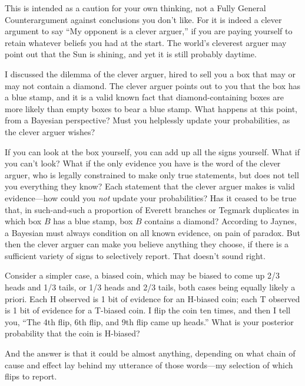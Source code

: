 {
 This is intended as a caution for your own thinking, not a Fully
General Counterargument against conclusions you don't
like. For it is indeed a clever argument to say ``My
opponent is a clever arguer,'' if you are paying
yourself to retain whatever beliefs you had at the start. The
world's cleverest arguer may point out that the Sun is
shining, and yet it is still probably daytime.}

\myendsectiontext


{
 I discussed the dilemma of the clever arguer, hired to sell you a
box that may or may not contain a diamond. The clever arguer points out
to you that the box has a blue stamp, and it is a valid known fact that
diamond-containing boxes are more likely than empty boxes to bear a
blue stamp. What happens at this point, from a Bayesian perspective?
Must you helplessly update your probabilities, as the clever arguer
wishes? }

{
 If you can look at the box yourself, you can add up all the signs
yourself. What if you can't look? What if the only
evidence you have is the word of the clever arguer, who is legally
constrained to make only true statements, but does not tell you
everything they know? Each statement that the clever arguer makes is
valid evidence---how could you \textit{not} update your probabilities?
Has it ceased to be true that, in such-and-such a proportion of Everett
branches or Tegmark duplicates in which box $B$ has a blue stamp, box $B$
contains a diamond? According to Jaynes, a Bayesian must always
condition on all known evidence, on pain of paradox. But then the
clever arguer can make you believe anything they choose, if there is a
sufficient variety of signs to selectively report. That
doesn't sound right.}

{
 Consider a simpler case, a biased coin, which may be biased to
come up 2/3 heads and 1/3 tails, or 1/3 heads and 2/3 tails, both cases
being equally likely a priori. Each H observed is 1 bit of evidence for
an H-biased coin; each T observed is 1 bit of evidence for a T-biased
coin. I flip the coin ten times, and then I tell you,
``The 4th flip, 6th flip, and 9th flip came up
heads.'' What is your posterior probability that the
coin is H-biased?}

{
 And the answer is that it could be almost anything, depending on
what chain of cause and effect lay behind my utterance of those
words---my selection of which flips to report.}

